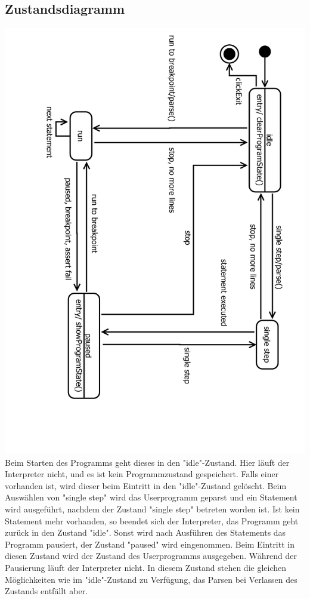 \documentclass[10pt,a4paper,titlepage]{article}
\begin{document}
\subsection{Zustandsdiagramm}
\includegraphics[angle=90, scale=0.6]{images/Zustandsdiagramm.pdf}\newline
{}
Beim Starten des Programms geht dieses in den "idle"-Zustand. Hier läuft der Interpreter nicht, und es ist kein Programmzustand gespeichert. Falls einer vorhanden ist, wird dieser beim Eintritt in den "idle"-Zustand gelöscht.\newline
Beim Auswählen von "single step" wird das Userprogramm geparst und ein Statement wird ausgeführt, nachdem der Zustand "single step" betreten worden ist. Ist kein Statement mehr vorhanden, so beendet sich der Interpreter, das Programm geht zurück in den Zustand "idle". Sonst wird nach Ausführen des Statements das Programm pausiert, der Zustand "paused" wird eingenommen. Beim Eintritt in diesen Zustand wird der Zustand des Userprogramms ausgegeben. Während der Pausierung läuft der Interpreter nicht. In diesem Zustand stehen die gleichen Möglichkeiten wie im "idle"-Zustand zu Verfügung, das Parsen bei Verlassen des Zustands entfällt aber.\newline
\end{document}
